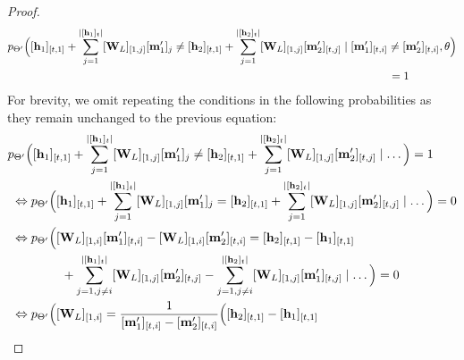 \begin{proof}
    \begin{align}
        &p_{\Theta'}\Big([\mathbf{h}_1]_{[t,1]}+\sum_{j=1}^{|[\mathbf{h}_1]_t|}[\mathbf{W}_{L}]_{[1,j]}[\mathbf{m}'_{1}]_j\neq[\mathbf{h}_2]_{[t,1]}+\sum_{j=1}^{|[\mathbf{h}_2]_t|}[\mathbf{W}_{L}]_{[1,j]}[\mathbf{m}'_{2}]_{[t,j]} \mid [\mathbf{m}'_{1}]_{[t,i]}\neq[\mathbf{m}'_{2}]_{[t,i]},\theta\Big) \nonumber\\
        &\qquad\qquad\qquad\qquad\qquad\qquad\qquad\qquad\qquad\qquad\qquad\qquad\qquad\qquad\qquad\qquad\qquad =1 
    \end{align}
    For brevity, we omit repeating the conditions in the following probabilities as they remain unchanged to the previous equation:
    \begin{subequations}
    \begin{align}
        &\prob_{\Parameters'}\Big([\hiddenstates_1]_{[\tokenposition,1]}+\sum_{j=1}^{|[\hiddenstates_1]_\tokenposition|}[\mlpweights_{\nlayers}]_{[1,j]}[\MLP'_{1}]_j\neq[\hiddenstates_2]_{[\tokenposition,1]}+\sum_{j=1}^{|[\hiddenstates_2]_\tokenposition|}[\mlpweights_{\nlayers}]_{[1,j]}[\MLP'_{2}]_{[\tokenposition,j]}\mid\ldots\Big)=1\\
        &\,\,\Leftrightarrow\prob_{\Parameters'}\Big([\hiddenstates_1]_{[\tokenposition,1]}+\sum_{j=1}^{|[\hiddenstates_1]_\tokenposition|}[\mlpweights_{\nlayers}]_{[1,j]}[\MLP'_{1}]_j=[\hiddenstates_2]_{[\tokenposition,1]}+\sum_{j=1}^{|[\hiddenstates_2]_\tokenposition|}[\mlpweights_{\nlayers}]_{[1,j]}[\MLP'_{2}]_{[\tokenposition,j]}\mid \ldots \Big)=0\\
        &\,\,\Leftrightarrow\prob_{\Parameters'}\Big([\mlpweights_{\nlayers}]_{[1,i]}[\MLP'_{1}]_{[\tokenposition,i]}-[\mlpweights_{\nlayers}]_{[1,i]}[\MLP'_{2}]_{[\tokenposition,i]} =[\hiddenstates_2]_{[\tokenposition,1]}-[\hiddenstates_1]_{[\tokenposition,1]}\\
        &\,\,\qquad\qquad+\sum_{j=1,j\neq i}^{|[\hiddenstates_1]_\tokenposition|}[\mlpweights_{\nlayers}]_{[1,j]}[\MLP'_{2}]_{[\tokenposition,j]}-\sum_{j=1,j\neq i}^{|[\hiddenstates_2]_\tokenposition|}[\mlpweights_{\nlayers}]_{[1,j]}[\MLP'_{1}]_{[\tokenposition,j]}\mid\ldots\Big)=0 \nonumber \\
        &\,\,\Leftrightarrow\prob_{\Parameters'}\Big([\mlpweights_{\nlayers}]_{[1,i]}=\frac{1}{[\MLP'_{1}]_{[\tokenposition,i]}-[\MLP'_{2}]_{[\tokenposition,i]}}\Big([\hiddenstates_2]_{[\tokenposition,1]}-[\hiddenstates_1]_{[\tokenposition,1]} \label{eq:injective_transformer_mlp_eq_4} \\

\end{align}
\end{subequations}
\end{proof}
